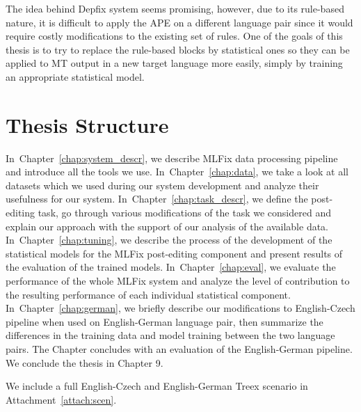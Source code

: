 The idea behind Depfix system seems promising, however, due to its rule-based nature, it is difficult
to apply the APE on a different language pair since it would require costly modifications to the
existing set of rules. One of the goals of this thesis is to try to replace the rule-based blocks
by statistical ones so they can be applied to 
MT output in a new target language more easily, simply
by training an appropriate statistical model.


\section{Thesis Structure}

In~Chapter~\ref{chap:system_descr}, we describe MLFix data processing
pipeline and introduce all the tools we use.
In~Chapter~\ref{chap:data}, we take a look at all datasets which we used during our system
development and analyze their usefulness for our system.
In~Chapter~\ref{chap:task_descr}, we define the post-editing task, go through
various modifications of the task we considered and explain our
approach with the support of our analysis of the available data.
In~Chapter~\ref{chap:tuning}, we describe the process of the development
of the statistical models for the MLFix post-editing component and present
results of the evaluation of the trained models.
In~Chapter~\ref{chap:eval}, we evaluate the performance of the whole MLFix system
and analyze the level of contribution to the resulting performance
of each individual statistical component.
In~Chapter~\ref{chap:german}, we briefly describe our modifications to English-Czech pipeline
when used on English-German language pair, then summarize the differences
in the training data and model training between the two language pairs. The Chapter concludes with an evaluation of the English-German pipeline.
We conclude the thesis in Chapter 9.

We include a full English-Czech and English-German Treex scenario in Attachment~\ref{attach:scen}.


